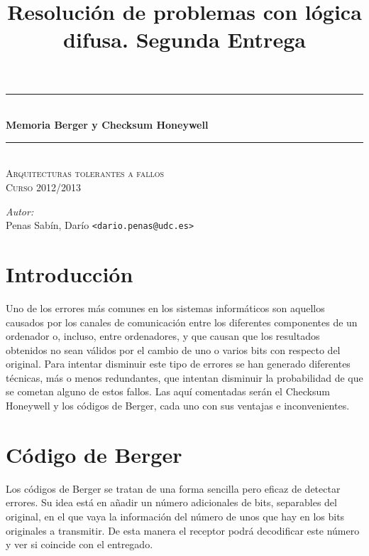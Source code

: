 \documentclass[a4paper]{article}
\title{Resolución de problemas con lógica difusa. Segunda Entrega}
\newcommand{\HRule}{\rule{\linewidth}{0.5mm}}
\begin{document}
	\begin{titlepage}
		\begin{center}

			\HRule \\[0.4cm]
			{ \huge \bfseries Memoria Berger y Checksum Honeywell}\\[0.4cm]
			\HRule \\[0cm]

			\vspace{1cm}
			\textsc{\Large Arquitecturas tolerantes a fallos}\\[0.5cm]
			\textsc{\Large Curso 2012/2013}\\[0.5cm]
		\end{center}

		\vfill
		\hfill
		\emph{Autor:}
		\vspace{0.5cm}
		\\  
		\vspace{0.1cm}
		\hfill Penas Sabín, Darío \texttt{<dario.penas@udc.es>}\\
		\vspace{0.1cm}

	\end{titlepage}
\tableofcontents
\clearpage

\section{Introducción}
	Uno de los errores más comunes en los sistemas informáticos son aquellos causados por los canales de comunicación entre los diferentes componentes de un ordenador o, incluso, entre ordenadores, y que causan que los resultados obtenidos no sean válidos por el cambio de uno o varios bits con respecto del original. Para intentar disminuir este tipo de errores se han generado diferentes técnicas, más o menos redundantes, que intentan disminuir la probabilidad de que se cometan alguno de estos fallos.
	Las aquí comentadas serán el Checksum Honeywell y los códigos de Berger, cada uno con sus ventajas e inconvenientes.

\section{Código de Berger}
	Los códigos de Berger se tratan de una forma sencilla pero eficaz de detectar errores. Su idea está en añadir un número adicionales de bits, separables del original, en el que vaya la información del número de unos que hay en los bits originales a transmitir. De esta manera el receptor podrá decodificar este número y ver si coincide con el entregado.
\end{document}
